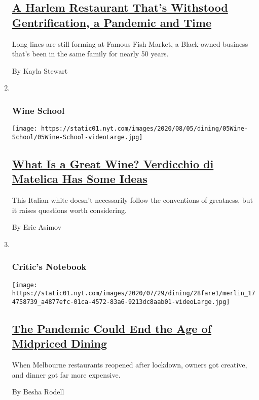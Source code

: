 \begin{enumerate}
{  \subsection{\texorpdfstring{\href{/2020/07/30/dining/famous-fish-market-harlem.html}{A
  Harlem Restaurant That's Withstood Gentrification, a Pandemic and
  Time}}{A Harlem Restaurant That's Withstood Gentrification, a Pandemic and Time}}\label{a-harlem-restaurant-thats-withstood-gentrification-a-pandemic-and-time}}

  Long lines are still forming at Famous Fish Market, a Black-owned
  business that's been in the same family for nearly 50 years.

  By Kayla Stewart
\item ~
  \hypertarget{wine-school}{%
  \subsubsection{Wine School}\label{wine-school}}

  \texttt{[image: https://static01.nyt.com/images/2020/08/05/dining/05Wine-School/05Wine-School-videoLarge.jpg]}

  \hypertarget{what-is-a-great-wine-verdicchio-di-matelica-has-some-ideas}{%
  \subsection{\texorpdfstring{\href{/2020/07/30/dining/drinks/wine-school-verdicchio-di-matelica.html}{What
  Is a Great Wine? Verdicchio di Matelica Has Some
  Ideas}}{What Is a Great Wine? Verdicchio di Matelica Has Some Ideas}}\label{what-is-a-great-wine-verdicchio-di-matelica-has-some-ideas}}

  This Italian white doesn't necessarily follow the conventions of
  greatness, but it raises questions worth considering.

  By Eric Asimov
\item ~
  \hypertarget{critics-notebook-2}{%
  \subsubsection{Critic's Notebook}\label{critics-notebook-2}}

  \texttt{[image: https://static01.nyt.com/images/2020/07/29/dining/28fare1/merlin\_174758739\_a4877efc-01ca-4572-83a6-9213dc8aab01-videoLarge.jpg]}

  \hypertarget{the-pandemic-could-end-the-age-of-midpriced-dining}{%
  \subsection{\texorpdfstring{\href{/2020/07/28/dining/melbourne-restaurants-coronavirus.html}{The
  Pandemic Could End the Age of Midpriced
  Dining}}{The Pandemic Could End the Age of Midpriced Dining}}\label{the-pandemic-could-end-the-age-of-midpriced-dining}}

  When Melbourne restaurants reopened after lockdown, owners got
  creative, and dinner got far more expensive.

  By Besha Rodell
\end{enumerate}

